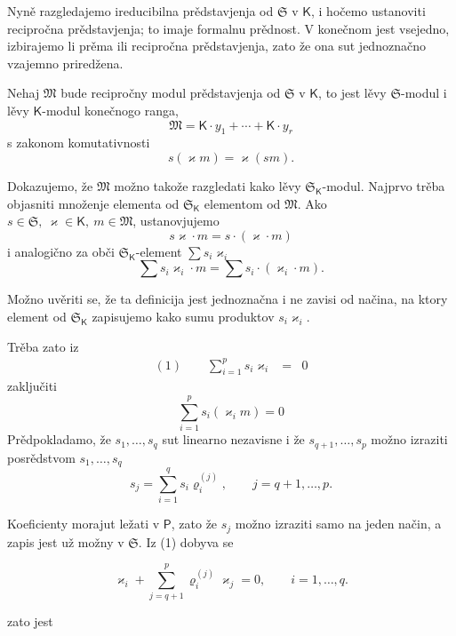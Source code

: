 \documentclass[11pt]{article}
\begin{document}
Nyně razgledajemo ireducibilna prědstavjenja od \(\mathfrak S\) v \(\mathsf K\), i hočemo ustanoviti recipročna prědstavjenja; to imaje formalnu prědnost. V konečnom jest vsejedno, izbirajemo li prěma ili recipročna prědstavjenja, zato že ona sut jednoznačno vzajemno priredžena.

Nehaj \(\mathfrak M\) bude recipročny modul prědstavjenja od \(\mathfrak S\) v \(\mathsf K\), to jest lěvy \(\mathfrak S\)-modul i lěvy \(\mathsf K\)-modul konečnogo ranga,
\[
\mathfrak M=\mathsf K\cdot y_1+\cdots+\mathsf K\cdot y_r
\]
s zakonom komutativnosti
\[
s(\varkappa m)=\varkappa (sm).
\]

Dokazujemo, že \(\mathfrak M\) možno takože razgledati kako lěvy \(\mathfrak S_{\mathsf K}\)-modul. Najprvo trěba objasniti množenje elementa od \(\mathfrak S_{\mathsf K}\) elementom od \(\mathfrak M\). Ako \(s\in\mathfrak S,\ \varkappa \in\mathsf K,\ m\in\mathfrak M\), ustanovjujemo
\[
s\varkappa \cdot m=s\cdot(\varkappa \cdot m)
\]
i analogično za obči \(\mathfrak S_{\mathsf K}\)-element \(\sum s_i\varkappa _i\)
\[
\sum s_i\varkappa _i\cdot m=\sum s_i\cdot(\varkappa _i\cdot m).
\]

Možno uvěriti se, že ta definicija jest jednoznačna i ne zavisi od načina, na ktory element od \(\mathfrak S_{\mathsf K}\) zapisujemo kako sumu produktov \(s_i\varkappa _i\).

Trěba zato iz
\[
\begin{array}{rcl}
(1)\qquad \displaystyle\sum_{i=1}^{p}s_i\varkappa _i&=&0
\end{array}
\]
zaključiti
\[
\sum_{i=1}^{p}s_i(\varkappa _i m)=0
\]
Prědpokladamo, že \(s_1,\ldots,s_q\) sut linearno nezavisne i že \(s_{q+1},\ldots,s_p\) možno izraziti posrědstvom \(s_1,\ldots,s_q\)
\[
s_j=\sum_{i=1}^{q}s_i\varrho_i^{(j)},\qquad j=q+1,\ldots,p.
\]

Koeficienty morajut ležati v \(\mathsf P\), zato že \(s_j\) možno izraziti samo na jeden način, a zapis jest už možny v \(\mathfrak S\). Iz (1) dobyva se

\[
\varkappa _i+\sum_{j=q+1}^{p}\varrho_i^{(j)}\varkappa _j=0,\qquad i=1,\ldots,q.
\]

zato jest
\end{document}
